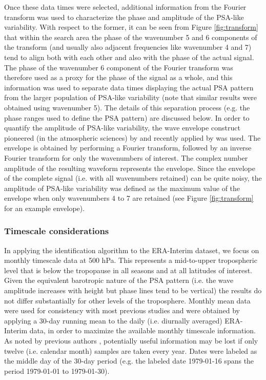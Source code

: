 Once these data times were selected, additional information from the Fourier transform was used to characterize the phase and amplitude of the PSA-like variability. With respect to the former, it can be seen from Figure \ref{fig:transform} that within the search area the phase of the wavenumber 5 and 6 components of the transform (and usually also adjacent frequencies like wavenumber 4 and 7) tend to align both with each other and also with the phase of the actual signal. The phase of the wavenumber 6 component of the Fourier transform was therefore used as a proxy for the phase of the signal as a whole, and this information was used to separate data times displaying the actual PSA pattern from the larger population of PSA-like variability (note that similar results were obtained using wavenumber 5). The details of this separation process (e.g. the phase ranges used to define the PSA pattern) are discussed below. In order to quantify the amplitude of PSA-like variability, the wave envelope construct pioneered (in the atmospheric sciences) by \citet{Zimin2003} and recently applied by \citet{IrvingSimmonds2015} was used. The envelope is obtained by performing a Fourier transform, followed by an inverse Fourier transform for only the wavenumbers of interest. The complex number amplitude of the resulting waveform represents the envelope. Since the envelope of the complete signal (i.e. with all wavenumbers retained) can be quite noisy, the amplitude of PSA-like variability was defined as the maximum value of the envelope when only wavenumbers 4 to 7 are retained (see Figure \ref{fig:transform} for an example envelope).

\subsubsection{Timescale considerations}

In applying the identification algorithm to the ERA-Interim dataset, we focus on monthly timescale data at 500 hPa. This represents a mid-to-upper tropospheric level that is below the tropopause in all seasons and at all latitudes of interest. Given the equivalent barotropic nature of the PSA pattern (i.e. the wave amplitude increases with height but phase lines tend to be vertical) the results do not differ substantially for other levels of the troposphere. Monthly mean data were used for consistency with most previous studies and were obtained by applying a 30-day running mean to the daily (i.e. diurnally averaged) ERA-Interim data, in order to maximize the available monthly timescale information. As noted by previous authors \citep[e.g.][]{Kidson1988}, potentially useful information may be lost if only twelve (i.e. calendar month) samples are taken every year. Dates were labeled as the middle day of the 30-day period (e.g. the labeled date 1979-01-16 spans the period 1979-01-01 to 1979-01-30).

